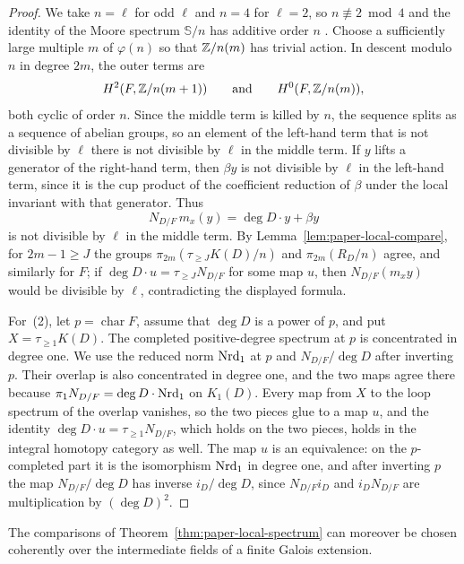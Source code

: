 \begin{proof}
We take $n=\ell$ for odd $\ell$ and $n=4$ for $\ell=2$, so $n\not\equiv2\bmod4$ and the identity of the Moore spectrum $\mathbb S/n$ has additive order $n$ \cite[p.~257]{Oka1984}.
Choose a sufficiently large multiple $m$ of $\varphi(n)$ so that $\mathbb Z/n(m)$ has trivial action.
In descent modulo $n$ in degree $2m$, the outer terms are
\[
 H^2(F,\mathbb Z/n(m+1))\qquad\text{and}\qquad H^0(F,\mathbb Z/n(m)),
\]
both cyclic of order $n$.
Since the middle term is killed by $n$, the sequence splits as a sequence of abelian groups, so an element of the left-hand term that is not divisible by $\ell$ there is not divisible by $\ell$ in the middle term.
If $y$ lifts a generator of the right-hand term, then $\beta y$ is not divisible by $\ell$ in the left-hand term, since it is the cup product of the coefficient reduction of $\beta$ under the local invariant with that generator.
Thus
\[
 N_{D/F}\,m_x(y)=\deg D\cdot y+\beta y
\]
is not divisible by $\ell$ in the middle term.
By Lemma~\ref{lem:paper-local-compare}, for $2m-1\ge J$ the groups $\pi_{2m}(\tau_{\ge J}K(D)/n)$ and $\pi_{2m}(R_D/n)$ agree, and similarly for $F$; if $\deg D\cdot u=\tau_{\ge J}N_{D/F}$ for some map $u$, then $N_{D/F}(m_xy)$ would be divisible by $\ell$, contradicting the displayed formula.

For~(2), let $p=\operatorname{char}F$, assume that $\deg D$ is a power of $p$, and put $X=\tau_{\ge1}K(D)$.
The completed positive-degree spectrum at $p$ is concentrated in degree one.
We use the reduced norm $\operatorname{Nrd}_1$ at $p$ and $N_{D/F}/\deg D$ after inverting $p$.
Their overlap is also concentrated in degree one, and the two maps agree there because $\pi_1N_{D/F}=\deg D\cdot\operatorname{Nrd}_1$ on $K_1(D)$.
Every map from $X$ to the loop spectrum of the overlap vanishes, so the two pieces glue to a map $u$, and the identity $\deg D\cdot u=\tau_{\ge1}N_{D/F}$, which holds on the two pieces, holds in the integral homotopy category as well.
The map $u$ is an equivalence: on the $p$-completed part it is the isomorphism $\operatorname{Nrd}_1$ in degree one, and after inverting $p$ the map $N_{D/F}/\deg D$ has inverse $i_D/\deg D$, since $N_{D/F}i_D$ and $i_DN_{D/F}$ are multiplication by $(\deg D)^2$.
\end{proof}

The comparisons of Theorem~\ref{thm:paper-local-spectrum} can moreover be chosen coherently over the intermediate fields of a finite Galois extension.

